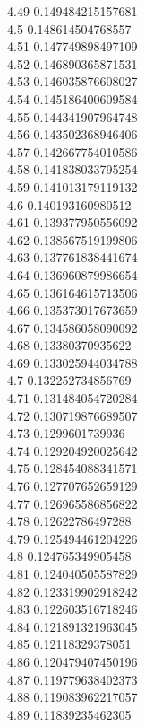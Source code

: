 {4.49	0.149484215157681\\
4.5	0.148614504768557\\
4.51	0.147749898497109\\
4.52	0.146890365871531\\
4.53	0.146035876608027\\
4.54	0.145186400609584\\
4.55	0.144341907964748\\
4.56	0.143502368946406\\
4.57	0.142667754010586\\
4.58	0.141838033795254\\
4.59	0.141013179119132\\
4.6	0.140193160980512\\
4.61	0.139377950556092\\
4.62	0.138567519199806\\
4.63	0.137761838441674\\
4.64	0.136960879986654\\
4.65	0.136164615713506\\
4.66	0.135373017673659\\
4.67	0.134586058090092\\
4.68	0.13380370935622\\
4.69	0.133025944034788\\
4.7	0.132252734856769\\
4.71	0.131484054720284\\
4.72	0.130719876689507\\
4.73	0.1299601739936\\
4.74	0.129204920025642\\
4.75	0.128454088341571\\
4.76	0.127707652659129\\
4.77	0.126965586856822\\
4.78	0.12622786497288\\
4.79	0.125494461204226\\
4.8	0.124765349905458\\
4.81	0.124040505587829\\
4.82	0.123319902918242\\
4.83	0.122603516718246\\
4.84	0.121891321963045\\
4.85	0.12118329378051\\
4.86	0.120479407450196\\
4.87	0.119779638402373\\
4.88	0.119083962217057\\
4.89	0.11839235462305\\
}
